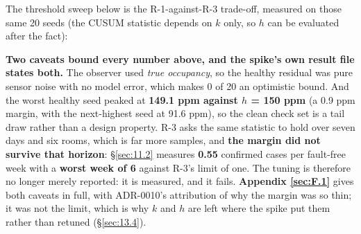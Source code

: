 The threshold sweep below is the R-1-against-R-3 trade-off, measured on those same 20 seeds (the
CUSUM statistic depends on $k$ only, so $h$ can be evaluated after the fact):

\begin{center}
\end{center}

\textbf{Two caveats bound every number above, and the spike's own result file states both.} The
observer used \emph{true occupancy}, so the healthy residual was pure sensor noise with no model
error, which makes 0 of 20 an optimistic bound. And the worst healthy seed peaked at
\textbf{149.1 ppm against $h$ = 150 ppm} (a 0.9 ppm margin, with the next-highest seed at
91.6 ppm), so the clean check set is a tail draw rather than a design property. R-3 asks the same
statistic to hold over seven days and six rooms, which is far more samples, and \textbf{the margin
did not survive that horizon}: §\ref{sec:11.2} measures \textbf{0.55} confirmed cases per fault-free week with
a \textbf{worst week of 6} against R-3's limit of one. The tuning is therefore no longer merely
reported: it is measured, and it fails. \textbf{Appendix \ref{sec:F.1}} gives both caveats in full, with
ADR-0010's attribution of why the margin was so thin; it was not the limit, which is why $k$ and $h$
are left where the spike put them rather than retuned (§\ref{sec:13.4}).
